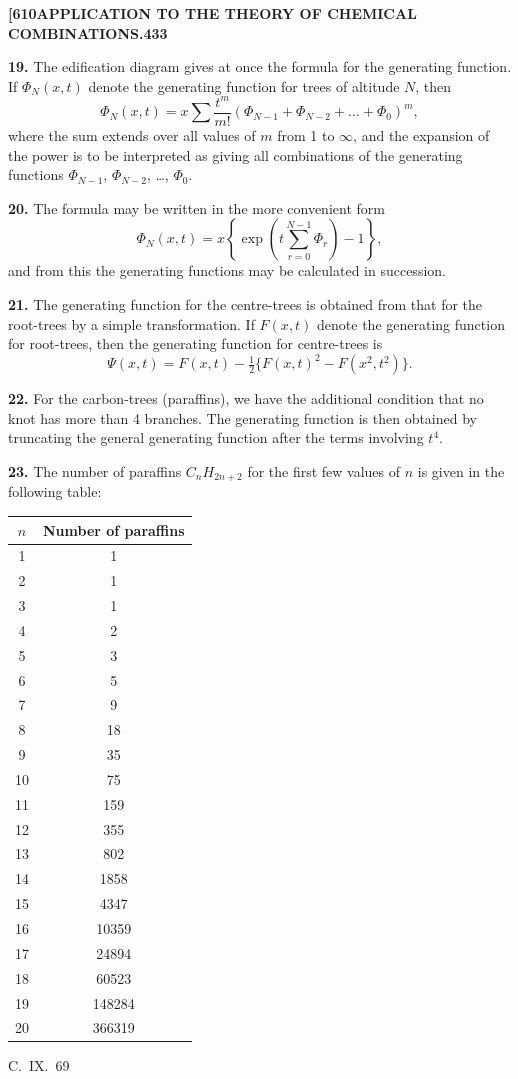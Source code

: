 \documentclass[11pt,a4paper]{book}
\begin{document}
{\newpage
\noindent\textbf{[610}\hspace{\fill}\textbf{APPLICATION TO THE THEORY OF CHEMICAL COMBINATIONS.}\hspace{\fill}\textbf{433}

\noindent\textbf{19.}
The edification diagram gives at once the formula for the generating function. If $\Phi_N(x,t)$ denote the generating function for trees of altitude $N$, then
\[
\Phi_N(x,t) = x \sum \frac{t^m}{m!} \left(\Phi_{N-1} + \Phi_{N-2} + \ldots + \Phi_0\right)^m,
\]
where the sum extends over all values of $m$ from 1 to $\infty$, and the expansion of the power is to be interpreted as giving all combinations of the generating functions $\Phi_{N-1}$, $\Phi_{N-2}$, \ldots, $\Phi_0$.

\medskip
\noindent\textbf{20.}
The formula may be written in the more convenient form
\[
\Phi_N(x,t) = x \left\{\exp\left(t \sum_{r=0}^{N-1} \Phi_r\right) - 1\right\},
\]
and from this the generating functions may be calculated in succession.

\medskip
\noindent\textbf{21.}
The generating function for the centre-trees is obtained from that for the root-trees by a simple transformation. If $F(x,t)$ denote the generating function for root-trees, then the generating function for centre-trees is
\[
\Psi(x,t) = F(x,t) - \tfrac{1}{2}\{F(x,t)^2 - F(x^2,t^2)\}.
\]

\medskip
\noindent\textbf{22.}
For the carbon-trees (paraffins), we have the additional condition that no knot has more than 4 branches. The generating function is then obtained by truncating the general generating function after the terms involving $t^4$.

\medskip
\noindent\textbf{23.}
The number of paraffins $C_nH_{2n+2}$ for the first few values of $n$ is given in the following table:

\begin{center}
\begin{tabular}{|c|c|}
\hline
$n$ & Number of paraffins \\
\hline
1 & 1 \\
2 & 1 \\
3 & 1 \\
4 & 2 \\
5 & 3 \\
6 & 5 \\
7 & 9 \\
8 & 18 \\
9 & 35 \\
10 & 75 \\
11 & 159 \\
12 & 355 \\
13 & 802 \\
14 & 1858 \\
15 & 4347 \\
16 & 10359 \\
17 & 24894 \\
18 & 60523 \\
19 & 148284 \\
20 & 366319 \\
\hline
\end{tabular}
\end{center}
\hfill C.~IX.\ 69

}
\end{document}
